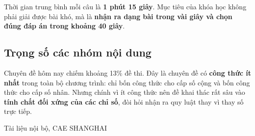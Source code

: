 \documentclass[11pt, a4paper]{article}
\begin{document}
Thời gian trung bình mỗi câu là \textbf{1 phút 15 giây}. Mục tiêu của khóa học không phải giải được bài khó, mà là \textbf{nhận ra dạng bài trong vài giây và chọn đúng đáp án trong khoảng 40 giây}.

\subsection{Trọng số các nhóm nội dung}


Chuyên đề hôm nay chiếm khoảng 13\% đề thi. Đây là chuyên đề có \textbf{công thức ít nhất} trong toàn bộ chương trình: chỉ bốn công thức cho cấp số cộng và bốn công thức cho cấp số nhân. Nhưng chính vì ít công thức nên đề khai thác rất sâu vào \textbf{tính chất đối xứng của các chỉ số}, đòi hỏi nhận ra quy luật thay vì thay số trực tiếp.
\vspace{0.8cm}
\begin{center}
{\footnotesize\color{cae_blue} Tài liệu nội bộ, CAE SHANGHAI}
\end{center}
\end{document}
